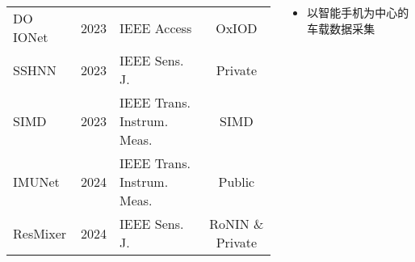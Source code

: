 \begin{frame}
\begin{columns}[t]
\begin{column}{0.4\textwidth}
{\begin{tabular*}{1.2\textwidth}{@{\extracolsep{\fill}}lclc}
				              DO IONet & 2023 & IEEE Access                     & OxIOD                  \\
				                 SSHNN & 2023 & IEEE Sens. J.                   & Private                \\
				                  SIMD & 2023 & IEEE Trans. Instrum. Meas.      & SIMD                   \\ %
				                IMUNet & 2024 & IEEE Trans. Instrum. Meas.      & Public                 \\
				              ResMixer & 2024 & IEEE Sens. J.                   & RoNIN \& Private       \\
				\bottomrule
			\end{tabular*}     
		}
		\end{column}   
		\begin{column}{0.6\textwidth}
		    \begin{itemize}
				\item 以智能手机为中心的车载数据采集
			\end{itemize}
		\end{column}
	\end{columns}	
\end{frame}

